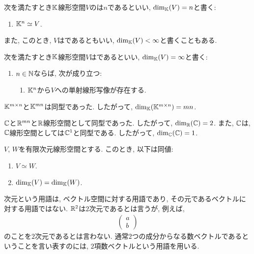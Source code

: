 \begin{definition}
次を満たすとき$\mathbb{K}$線形空間$V$のは$n$であるといい,
$\dim_{\mathbb{K}}(V)=n$と書く:
\begin{enumerate}
\item $\mathbb{K}^n\simeq V$.
\end{enumerate}
また,
このとき,
$V$はであるともいい, $\dim_{\mathbb{K}}(V)<\infty$と書くこともある.
\end{definition}

\begin{definition}
次を満たすとき$\mathbb{K}$線形空間$V$はであるといい,
$\dim_{\mathbb{K}}(V)=\infty$と書く:
\begin{enumerate}
\item $n\in \mathbb{N}$ならば, 次が成り立つ:
\begin{enumerate}
\item $\mathbb{K}^n$から$V$への単射線形写像が存在する.
\end{enumerate}
\end{enumerate}
\end{definition}

\begin{example}
$\mathbb{K}^{m\times n}$と$\mathbb{K}^{mn}$は同型であった.
したがって,
$\dim_{\mathbb{K}}(\mathbb{K}^{m\times n})=mn$.
\end{example}

\begin{example}
$\mathbb{C}$と$\mathbb{R}^{mn}$と$\mathbb{R}$線形空間として同型であった.
したがって,
$\dim_{\mathbb{R}}(\mathbb{C})=2$.
また,
$\mathbb{C}$は,
$\mathbb{C}$線形空間としては$\mathbb{C}^1$と同型である.
したがって,
$\dim_{\mathbb{C}}(\mathbb{C})=1$.
\end{example}

\begin{prop}
  $V$, $W$を有限次元線形空間とする.
  このとき, 以下は同値:
  \begin{enumerate}
  \item $V\simeq W$.
  \item $\dim_{\mathbb{K}}(V) = \dim_{\mathbb{K}}(W)$.
  \end{enumerate}
\end{prop}

\begin{remark}
次元という用語は,
ベクトル空間に対する用語であり, その元であるベクトルに対する用語ではない.
$\mathbb{R}^2$は$2$次元であるとは言うが,
例えば,
\begin{align*}
\begin{pmatrix}a\\b\end{pmatrix}
\end{align*}
のことを$2$次元であるとは言わない.
通常$2$つの成分からなる数ベクトルであるということを言い表すのには,
$2$項数ベクトルという用語を用いる.
\end{remark}

